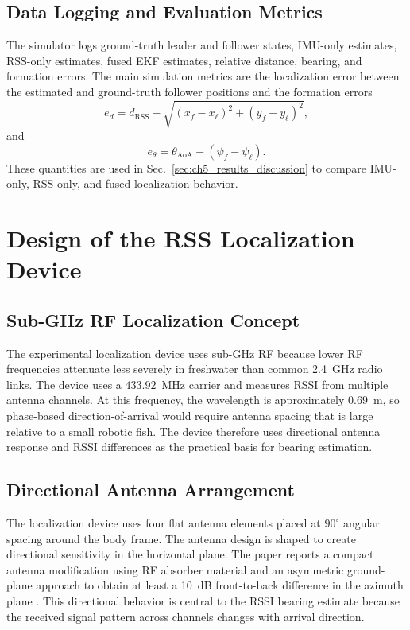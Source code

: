 \documentclass{uhcoethesis}
\begin{document}
\subsection{Data Logging and Evaluation Metrics}

The simulator logs ground-truth leader and follower states, IMU-only estimates, RSS-only estimates, fused EKF estimates, relative distance, bearing, and formation errors. The main simulation metrics are the localization error between the estimated and ground-truth follower positions and the formation errors
\begin{equation}
    e_d = d_{\mathrm{RSS}} - \sqrt{(x_f-x_\ell)^2+(y_f-y_\ell)^2},
    \label{eq:ch5_sim_distance_error}
\end{equation}
and
\begin{equation}
    e_{\theta} = \theta_{\mathrm{AoA}}-(\psi_f-\psi_\ell).
    \label{eq:ch5_sim_bearing_error}
\end{equation}
These quantities are used in Sec.~\ref{sec:ch5_results_discussion} to compare IMU-only, RSS-only, and fused localization behavior.

\section{Design of the RSS Localization Device}

\subsection{Sub-GHz RF Localization Concept}

The experimental localization device uses sub-GHz RF because lower RF frequencies attenuate less severely in freshwater than common 2.4~GHz radio links. The device uses a $433.92$~MHz carrier and measures RSSI from multiple antenna channels. At this frequency, the wavelength is approximately $0.69$~m, so phase-based direction-of-arrival would require antenna spacing that is large relative to a small robotic fish. The device therefore uses directional antenna response and RSSI differences as the practical basis for bearing estimation.

\subsection{Directional Antenna Arrangement}

The localization device uses four flat antenna elements placed at $90^\circ$ angular spacing around the body frame. The antenna design is shaped to create directional sensitivity in the horizontal plane. The paper reports a compact antenna modification using RF absorber material and an asymmetric ground-plane approach to obtain at least a 10~dB front-to-back difference in the azimuth plane \cite{Masood2026RSSI}. This directional behavior is central to the RSSI bearing estimate because the received signal pattern across channels changes with arrival direction.
\end{document}
